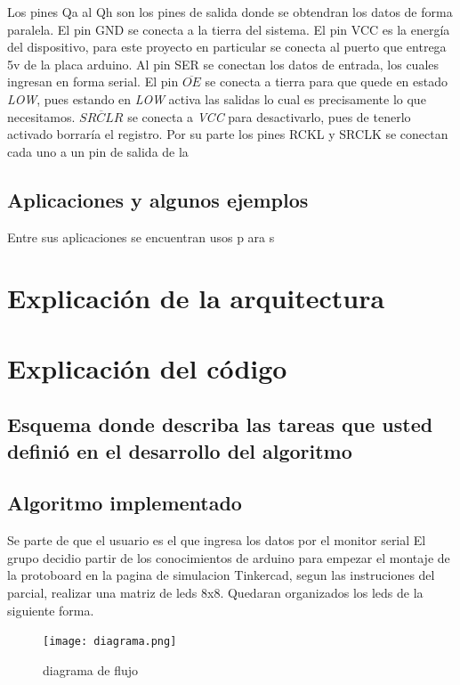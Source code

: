 \documentclass{article}
\begin{document}
Los pines Qa al Qh son los pines de salida donde se obtendran los datos de forma paralela. El pin GND se conecta a la tierra del sistema. El pin VCC es la energía del dispositivo, para este proyecto en particular se conecta al puerto que entrega 5v de la placa arduino. Al pin SER se conectan los datos de entrada, los cuales ingresan en forma serial. El pin $\overline{OE}$ se conecta a tierra para que quede en estado \textit{LOW}, pues estando en \textit{LOW} activa las salidas lo cual es precisamente lo que necesitamos. $\overline{SRCLR}$ se conecta a \textit{VCC} para desactivarlo, pues de tenerlo activado borraría el registro. Por su parte los pines RCKL y SRCLK se conectan cada uno a un pin de salida de la



\subsection{Aplicaciones y algunos ejemplos}
Entre sus aplicaciones se encuentran usos p ara s


\section{Explicación de la arquitectura} 

\section{Explicación del código} 

\subsection{Esquema donde describa las tareas que usted definió en el desarrollo del algoritmo}


\subsection{Algoritmo implementado}
Se parte de que el usuario es el que ingresa los datos por el monitor serial
El grupo decidio partir de los conocimientos de arduino para empezar el montaje de la protoboard en la pagina de simulacion Tinkercad, segun las instruciones del parcial, realizar una matriz de leds 8x8.
Quedaran organizados los leds de la siguiente forma.
    
    \begin{figure}[h]
    \texttt{[image: diagrama.png]}
    \centering
    \caption{diagrama de flujo}
    \label{fig:diagrama}
    \end{figure}
\end{document}
